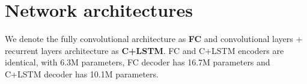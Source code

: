 \section{Network architectures}
\label{apx:archi}

We denote the fully convolutional architecture as \textbf{FC} and convolutional layers + recurrent layers architecture as \textbf{C+LSTM}. FC and C+LSTM encoders are identical, with 6.3M parameters, FC decoder has 16.7M parameters and C+LSTM decoder has 10.1M parameters.


